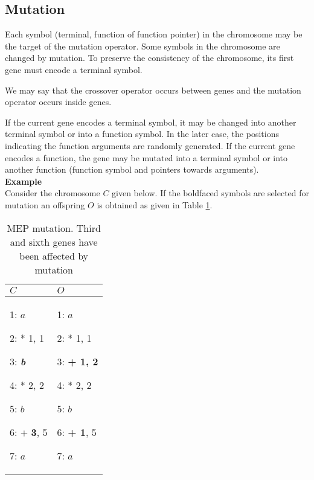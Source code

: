 \documentclass [11pt]{article}
\begin{document}
\subsection{Mutation}

Each symbol (terminal, function of function pointer) in the chromosome may 
be the target of the mutation operator. Some symbols in the chromosome are 
changed by mutation. To preserve the consistency of the chromosome, its 
first gene must encode a terminal symbol.

We may say that the crossover operator occurs between genes and the mutation 
operator occurs inside genes.

If the current gene encodes a terminal symbol, it may be changed into 
another terminal symbol or into a function symbol. In the later case, the 
positions indicating the function arguments are randomly generated. If the 
current gene encodes a function, the gene may be mutated into a terminal 
symbol or into another function (function symbol and pointers towards 
arguments).\\

\textbf{Example}\\

Consider the chromosome $C$ given below. If the boldfaced symbols are selected 
for mutation an offspring $O$ is obtained as given in Table \ref{mep_mutation}.


\begin{table}[htbp]
\caption{MEP mutation. Third and sixth genes have been affected by mutation}
\label{mep_mutation}
\begin{center}
\begin{tabular}
{p{70pt}p{70pt}}
\hline
$C$& 
$O$ \\
\hline
1: $a$ \par 2: * 1, 1 \par 3: \textbf{\textit{b}} \par 4: * 2, 2 \par 5: $b$ \par 6: +\textbf{ 3}, 5 \par 7: $a$& 
1: $a$ \par 2: * 1, 1 \par 3: \textbf{+ 1, 2} \par 4: * 2, 2 \par 5: $b$ \par 6: \textbf{+ 1}, 5 \par 7: $a$ \\
\hline
\end{tabular}
\end{center}
\end{table}
\end{document}
